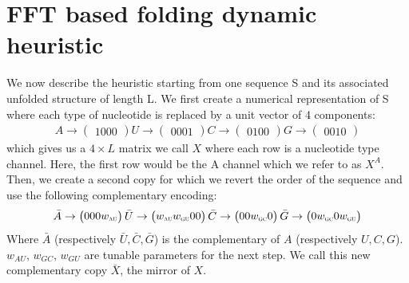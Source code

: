 \documentclass[a4paper,12pt]{article}
\begin{document}
\section*{FFT based folding dynamic heuristic}
\label{sec:orge1938b9}
We now describe the heuristic starting from one sequence S and its associated
unfolded structure of length L. We first create a numerical representation of S
where each type of nucleotide is replaced by a unit vector of 4 components:
\begin{equation}
\begin{split}
A \rightarrow \begin{pmatrix} 1 0 0 0 \end{pmatrix}
U \rightarrow \begin{pmatrix} 0 0 0 1 \end{pmatrix}
C \rightarrow \begin{pmatrix} 0 1 0 0 \end{pmatrix}
G \rightarrow \begin{pmatrix} 0 0 1 0 \end{pmatrix}
\end{split}
\end{equation}
which gives us a \(4 \times L\) matrix we call \(X\) where each row is a nucleotide
type channel. Here, the first row would be the A channel which we refer to as
\(X^A\). Then, we create a second copy for which we revert the order of the
sequence and use the following complementary encoding:
\begin{equation}
\begin{split}
\bar{A} \rightarrow \begin{pmatrix} 0 0 0 w_{\scalebox{0.5}{AU}} \end{pmatrix}
\bar{U} \rightarrow \begin{pmatrix} w_{\scalebox{0.5}{AU}} w_{\scalebox{0.5}{GU}} 0 0 \end{pmatrix}
\bar{C} \rightarrow \begin{pmatrix} 0 0 w_{\scalebox{0.5}{GC}} 0 \end{pmatrix}
\bar{G} \rightarrow \begin{pmatrix} 0 w_{\scalebox{0.5}{GC}} 0 w_{\scalebox{0.5}{GU}} \end{pmatrix}
\end{split}
\end{equation}
Where \(\bar{A}\) (respectively \(\bar{U}, \bar{C}, \bar{G}\)) is the complementary
of \(A\) (respectively \(U, C, G\)). \(w_{AU}\), \(w_{GC}\), \(w_{GU}\) are tunable
parameters for the next step. We call this new complementary copy \(\bar{X}\), the
mirror of \(X\).
\end{document}

